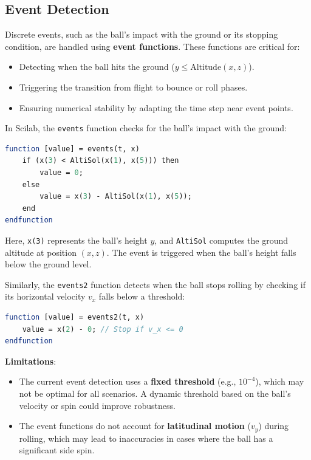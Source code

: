 \documentclass[10pt,a4paper]{report}
\begin{document}
\subsection{Event Detection}
\label{subsec:event_detection}

Discrete events, such as the ball's impact with the ground or its stopping condition, are handled using \textbf{event functions}. These functions are critical for:
\begin{itemize}
    \item Detecting when the ball hits the ground (\( y \leq \text{Altitude}(x, z) \)).
    \item Triggering the transition from flight to bounce or roll phases.
    \item Ensuring numerical stability by adapting the time step near event points.
\end{itemize}

In Scilab, the \texttt{events} function checks for the ball's impact with the ground:
\begin{lstlisting}[language=Scilab]
function [value] = events(t, x)
    if (x(3) < AltiSol(x(1), x(5))) then
        value = 0;
    else
        value = x(3) - AltiSol(x(1), x(5));
    end
endfunction
\end{lstlisting}
Here, \texttt{x(3)} represents the ball's height \( y \), and \texttt{AltiSol} computes the ground altitude at position \((x, z)\). The event is triggered when the ball's height falls below the ground level.

Similarly, the \texttt{events2} function detects when the ball stops rolling by checking if its horizontal velocity \( v_x \) falls below a threshold:
\begin{lstlisting}[language=Scilab]
function [value] = events2(t, x)
    value = x(2) - 0; // Stop if v_x <= 0
endfunction
\end{lstlisting}

\textbf{Limitations}:
\begin{itemize}
    \item The current event detection uses a \textbf{fixed threshold} (e.g., \( 10^{-4} \)), which may not be optimal for all scenarios. A dynamic threshold based on the ball's velocity or spin could improve robustness.
    \item The event functions do not account for \textbf{latitudinal motion} (\( v_y \)) during rolling, which may lead to inaccuracies in cases where the ball has a significant side spin.
\end{itemize}
\end{document}
